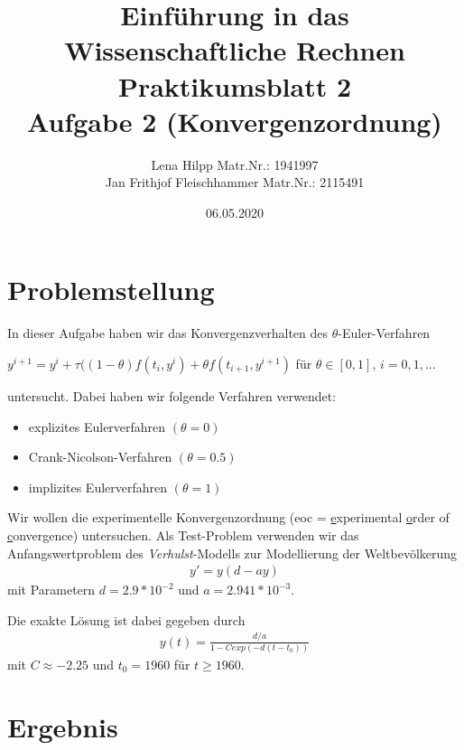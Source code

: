 \documentclass[11pt,a4paper]{article}
\title{Einf\"uhrung in das Wissenschaftliche Rechnen\\
  Praktikumsblatt 2\\
  Aufgabe 2 (Konvergenzordnung)}
\author{Lena Hilpp Matr.Nr.: 1941997\\Jan Frithjof Fleischhammer Matr.Nr.: 2115491}
\date{06.05.2020}
\begin{document}
  
  \maketitle
  
  \section*{Problemstellung}
  
  In dieser Aufgabe haben wir das Konvergenzverhalten des $\theta$-Euler-Verfahren
  \begin{center}
  	$y^{i+1}=y^i+\tau((1-\theta)f(t_i,y^i)+{\theta}f(t_{i+1},y^{i+1})$ f\"ur $\theta \in [0,1]$, $i = 0,1,...$
  \end{center}
  untersucht. Dabei haben wir folgende Verfahren verwendet:
  \begin{itemize}
  	\item explizites Eulerverfahren $(\theta = 0)$
  	\item Crank-Nicolson-Verfahren $(\theta = 0.5)$
  	\item implizites Eulerverfahren $(\theta = 1)$
  \end{itemize}
  
  Wir wollen die experimentelle Konvergenzordnung (eoc = \underline{e}xperimental \underline{o}rder of \underline{c}onvergence) untersuchen. Als Test-Problem verwenden wir das Anfangswertproblem des \textit{Verhulst}-Modells zur Modellierung der Weltbev\"olkerung
  \begin{align*}
  	\tag{Verhulst}
  	y'=y(d-ay)
  \end{align*}
  mit Parametern $d=2.9*10^{-2}$ und $a=2.941*10^{-3}$.
  
  Die exakte L\"osung ist dabei gegeben durch
  \begin{align}
  	y(t)=\frac{d/a}{1-C exp(-d(t-t_0))}
  \end{align}
  mit $C\approx -2.25$ und $t_0=1960$ f\"ur $t\geq1960$.
  
  \newpage
  
  \section*{Ergebnis}
\end{document}
